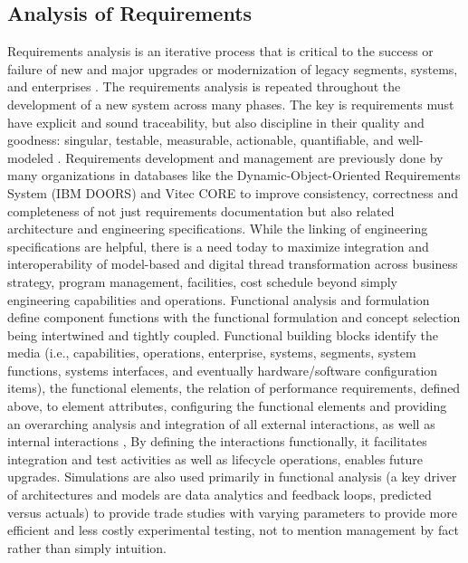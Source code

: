 \documentclass[num-refs]{wiley-article}
\begin{document}
\subsection{Analysis of Requirements}
\label{Analysis of Requirements}

Requirements analysis is an iterative process that is critical to the success or failure of new and major upgrades or modernization of legacy segments, systems, and enterprises \cite{Pesler2011}. The requirements analysis is repeated throughout the development of a new system across many phases. The key is requirements must have explicit and sound traceability, but also discipline in their quality and goodness: singular, testable, measurable, actionable, quantifiable, and well-modeled \cite{Pesler2011}. Requirements development and management are previously done by many organizations in databases like the Dynamic-Object-Oriented Requirements System (IBM DOORS) and Vitec CORE to improve consistency, correctness and completeness of not just requirements documentation but also related architecture and engineering specifications. While the linking of engineering specifications are helpful, there is a need today to maximize integration and interoperability of model-based and digital thread transformation across business strategy, program management, facilities, cost schedule beyond simply engineering capabilities and operations. Functional analysis and formulation define component functions with the functional formulation and concept selection being intertwined and tightly coupled. Functional building blocks identify the media (i.e., capabilities, operations, enterprise, systems, segments, system functions, systems interfaces, and eventually hardware/software configuration items), the functional elements, the relation of performance requirements, defined above, to element attributes, configuring the functional elements and providing an overarching analysis and integration of all external interactions, as well as internal interactions \cite{Kossiakoff2011}, By defining the interactions functionally, it facilitates integration and test activities as well as lifecycle operations,  enables future upgrades. Simulations are also used primarily in functional analysis (a key driver of architectures and models are data analytics and feedback loops, predicted versus actuals) to provide trade studies with varying parameters to provide more efficient and less costly experimental testing, not to mention management by fact rather than simply intuition.
\end{document}
